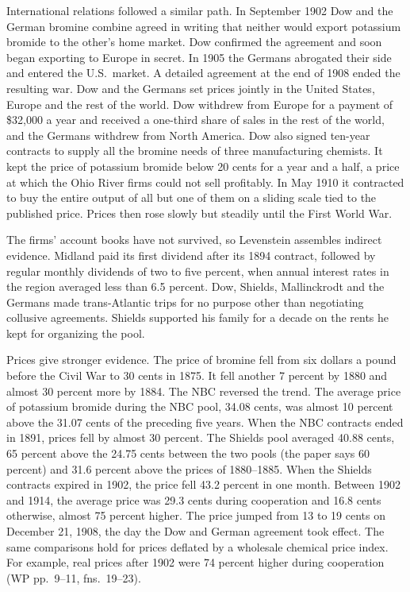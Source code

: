 International relations followed a similar path. In September 1902 Dow and the German bromine combine agreed in
writing that neither would export potassium bromide to the other's home market. Dow confirmed the agreement and
soon began exporting to Europe in secret. In 1905 the Germans abrogated their side and entered the U.S.\ market.
A detailed agreement at the end of 1908 ended the resulting war. Dow and the Germans set prices jointly in the
United States, Europe and the rest of the world. Dow withdrew from Europe for a payment of \$32,000 a year and
received a one-third share of sales in the rest of the world, and the Germans withdrew from North America. Dow
also signed ten-year contracts to supply all the bromine needs of three manufacturing chemists. It kept the price
of potassium bromide below 20 cents for a year and a half, a price at which the Ohio River firms could not sell
profitably. In May 1910 it contracted to buy the entire output of all but one of them on a sliding scale tied to
the published price. Prices then rose slowly but steadily until the First World War.

The firms' account books have not survived, so Levenstein assembles indirect evidence. Midland paid its first
dividend after its 1894 contract, followed by regular monthly dividends of two to five percent, when annual
interest rates in the region averaged less than 6.5 percent. Dow, Shields, Mallinckrodt and the Germans made
trans-Atlantic trips for no purpose other than negotiating collusive agreements. Shields supported his family for
a decade on the rents he kept for organizing the pool.

Prices give stronger evidence. The price of bromine fell from six dollars a pound before the Civil War to 30
cents in 1875. It fell another 7 percent by 1880 and almost 30 percent more by 1884. The NBC reversed the trend. The average price of potassium bromide during the NBC pool, 34.08 cents, was almost 10 percent above
the 31.07 cents of the preceding five years. When the NBC contracts ended in 1891, prices fell by almost 30
percent. The Shields pool averaged 40.88 cents, 65 percent above the 24.75 cents between the two pools (the paper
says 60 percent) and 31.6
percent above the prices of 1880--1885. When the Shields contracts expired in 1902, the price fell 43.2 percent
in one month. Between 1902 and 1914, the average price was 29.3 cents during cooperation and 16.8 cents
otherwise, almost 75 percent higher. The price jumped from 13 to 19 cents on December 21, 1908, the day the Dow
and German agreement took effect. The same comparisons hold for prices deflated by a wholesale chemical price
index. For example, real prices after 1902 were 74 percent higher during cooperation (WP pp.~9--11, fns.~19--23).


